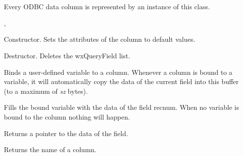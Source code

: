 \section{}\label{wxquerycol}

Every ODBC data column is represented by an instance of this class.




, 




Constructor. Sets the attributes of the column to default values.



Destructor. Deletes the wxQueryField list.



Binds a user-defined variable to a column. Whenever a column is bound to a
variable, it will automatically copy the data of the current field into this
buffer (to a maximum of {\it sz} bytes).



Fills the bound variable with the data of the field recnum. When no variable
is bound to the column nothing will happen.



Returns a pointer to the data of the field.



Returns the name of a column.
  


